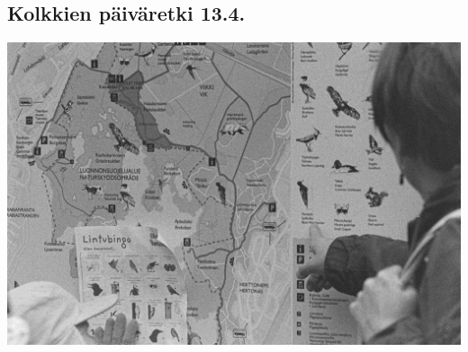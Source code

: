 \documentclass[10pt,finnish,a5paper,headings=small,twoside=semi]{scrartcl}
\begin{document}
\clearpage
\subsection{Kolkkien päiväretki 13.4.}

\vspace*{0.16cm}
\noindent\includegraphics[width=\linewidth]{assets/kolkkienpäiväretkibw1}
\end{document}
